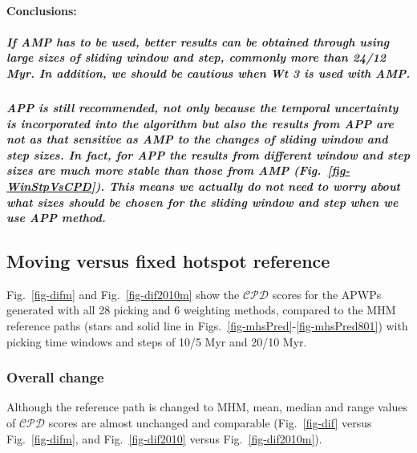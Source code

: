 \paragraph{Conclusions:}

\subparagraph{If AMP has to be used, better results can be obtained through
using large sizes of sliding window and step, commonly more than 24/12 Myr. In
addition, we should be cautious when Wt 3 is used with AMP.}

\subparagraph{APP is still recommended, not only because the temporal
uncertainty is incorporated into the algorithm but also the results from APP are
not as that sensitive as AMP to the changes of sliding window and step sizes. In
fact, for APP the results from different window and step sizes are much more
stable than those from AMP (Fig.~\ref{fig-WinStpVsCPD}). This means we actually
do not need to worry about what sizes should be chosen for the sliding window
and step when we use APP method.}


\subsection{Moving versus fixed hotspot reference}

Fig.~\ref{fig-difm} and Fig.~\ref{fig-dif2010m} show the $\mathcal{CPD}$ scores
for the APWPs generated with all 28 picking and 6 weighting methods, compared to
the MHM reference paths (stars and solid line in Figs.~\ref{fig-mhsPred}-\ref{fig-mhsPred801})
with picking time windows and steps of 10/5 Myr and 20/10 Myr.

\subsubsection{Overall change}

Although the reference path is changed to MHM, mean, median and range values of
$\mathcal{CPD}$ scores are almost unchanged and comparable (Fig.~\ref{fig-dif}
versus Fig.~\ref{fig-difm}, and Fig.~\ref{fig-dif2010} versus
Fig.~\ref{fig-dif2010m}).

